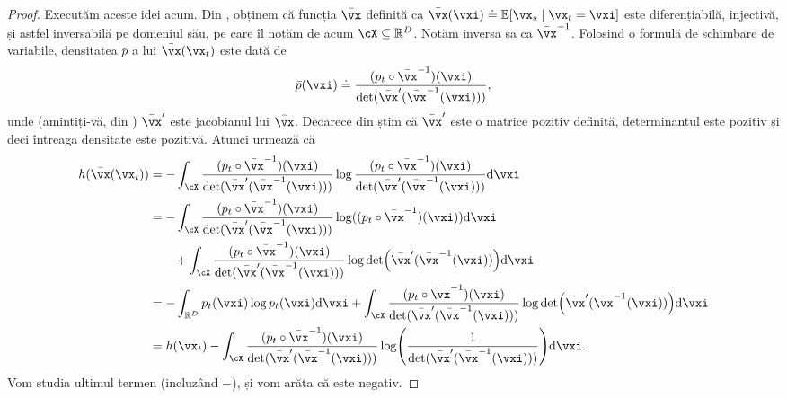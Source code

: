 \documentclass[../../book-main_ro.tex]{subfiles}
\begin{document}
\begin{proof}
    Executăm aceste idei acum. Din , obținem că funcția \(\bar{\vx}\) definită ca \(\bar{\vx}(\vxi) \doteq \Ex[\vx_{s} \given \vx_{t} = \vxi]\) este diferențiabilă, injectivă, și astfel inversabilă pe domeniul său, pe care îl notăm de acum \(\cX \subseteq \R^{D}\). Notăm inversa sa ca \(\bar{\vx}^{-1}\). Folosind o formulă de schimbare de variabile, densitatea \(\bar{p}\) a lui \(\bar{\vx}(\vx_{t})\) este dată de 
    \begin{equation}
        \bar{p}(\vxi) \doteq \frac{(p_{t} \circ \bar{\vx}^{-1})(\vxi)}{\det(\bar{\vx}^{\prime}(\bar{\vx}^{-1}(\vxi)))},
    \end{equation}
    unde (amintiți-vă, din ) \(\bar{\vx}^{\prime}\) este jacobianul lui \(\bar{\vx}\). Deoarece din  știm că \(\bar{\vx}^{\prime}\) este o matrice pozitiv definită, determinantul este pozitiv și deci întreaga densitate este pozitivă. Atunci urmează că 
    \begin{align}
        h(\bar{\vx}(\vx_{t}))
        &= -\int_{\cX}\frac{(p_{t} \circ \bar{\vx}^{-1})(\vxi)}{\det(\bar{\vx}^{\prime}(\bar{\vx}^{-1}(\vxi)))} \log \frac{(p_{t} \circ \bar{\vx}^{-1})(\vxi)}{\det(\bar{\vx}^{\prime}(\bar{\vx}^{-1}(\vxi)))} \odif{\vxi} \\ 
        &= -\int_{\cX}\frac{(p_{t} \circ \bar{\vx}^{-1})(\vxi)}{\det(\bar{\vx}^{\prime}(\bar{\vx}^{-1}(\vxi)))} \log((p_{t} \circ \bar{\vx}^{-1})(\vxi))\odif{\vxi} \\ 
        &\qquad + \int_{\cX}\frac{(p_{t} \circ
        \bar{\vx}^{-1})(\vxi)}{\det(\bar{\vx}^{\prime}(\bar{\vx}^{-1}(\vxi)))}\log\det\rp{\bar{\vx}^{\prime}(\bar{\vx}^{-1}(\vxi))}\odif{\vxi} \\ 
        &= -\int_{\R^{D}}p_{t}(\vxi)\log p_{t}(\vxi)\odif{\vxi}
        + \int_{\cX}\frac{(p_{t} \circ
        \bar{\vx}^{-1})(\vxi)}{\det(\bar{\vx}^{\prime}(\bar{\vx}^{-1}(\vxi)))}\log\det\rp{\bar{\vx}^{\prime}(\bar{\vx}^{-1}(\vxi))}\odif{\vxi} \\ 
        &= h(\vx_{t}) - \int_{\cX}\frac{(p_{t} \circ \bar{\vx}^{-1})(\vxi)}{\det(\bar{\vx}^{\prime}(\bar{\vx}^{-1}(\vxi)))}\log\rp{\frac{1}{\det(\bar{\vx}^{\prime}(\bar{\vx}^{-1}(\vxi)))}}\odif{\vxi}.
    \end{align}
    Vom studia ultimul termen (incluzând \(-\)), și vom arăta că este negativ.


\end{proof}
\end{document}
